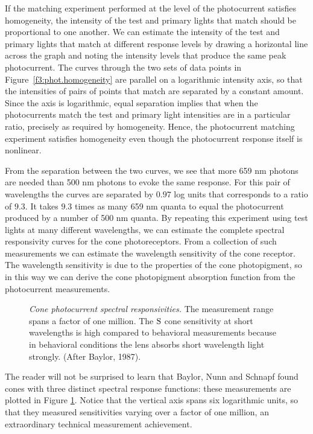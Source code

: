 If the matching experiment performed at the
level of the photocurrent satisfies homogeneity,
the intensity of the test and primary lights that match
should be proportional to one another.
We can estimate the intensity of the test and primary lights
that match at different response levels by drawing a horizontal
line across the graph and noting the intensity levels
that produce the same peak photocurrent.
The curves through the two sets of data points
in Figure~\ref{f3:phot.homogeneity}
are parallel on a logarithmic intensity axis,
so that the intensities of pairs of points that match
are separated by a constant amount.
Since the axis is logarithmic,
equal separation implies that when the photocurrents
match the test and primary light intensities are
in a particular ratio, precisely as required by homogeneity.
Hence, the photocurrent matching experiment satisfies
homogeneity even though the photocurrent response itself is
nonlinear.

From the separation between the two curves,
we see that more 659 nm
photons are needed than 500 nm photons
to evoke the same response.
For this pair of wavelengths
the curves are separated by $0.97$ log units
that corresponds to a ratio of $9.3$.
It takes $9.3$ times as many 659 nm quanta to
equal the photocurrent produced by a number of 500 nm quanta.
By repeating this experiment using test lights
at many different wavelengths, we can estimate the 
complete spectral responsivity curves for
the cone photoreceptors.
From a collection of such measurements we can
estimate the wavelength sensitivity of the cone receptor.
The wavelength sensitivity is due to the properties
of the cone photopigment, so in this way
we can derive the cone photopigment
absorption function from the photocurrent measurements.

\begin{figure}
\centerline {
}
\caption[Cone Photopigment Spectral Sensitivities]{
{\em Cone photocurrent spectral responsivities.}
The measurement range spans a factor of one million.
The $\mbox{S}$ cone sensitivity at short wavelengths is high compared
to behavioral measurements because in behavioral conditions
the lens absorbs short wavelength light strongly.
(After Baylor, 1987).
}
\label{f3:cone.sp.sens}
\end{figure}
The reader will not be surprised to learn
that Baylor, Nunn and Schnapf found cones with
three distinct spectral response functions:
these measurements are plotted
in Figure \ref{f3:cone.sp.sens}.
Notice that the vertical axis spans six logarithmic units,
so that they measured sensitivities varying
over a factor of one million,
an extraordinary technical measurement achievement.

